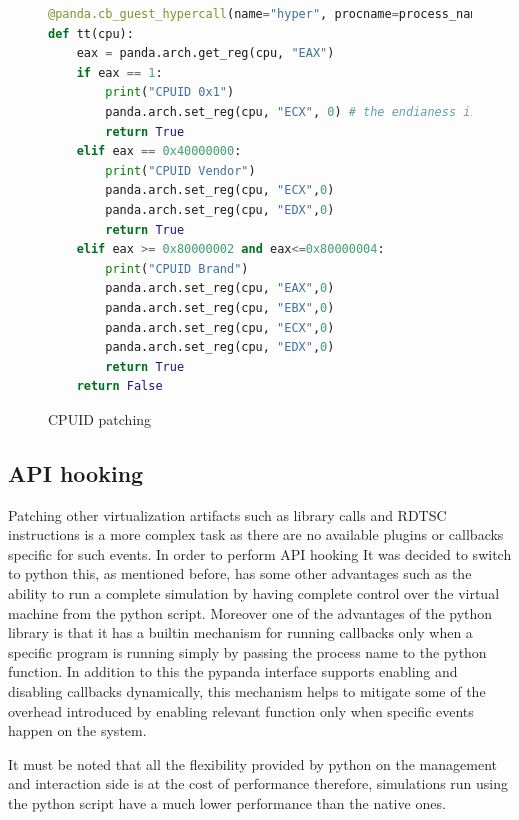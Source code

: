 \begin{figure}[htp]
\centering
\begin{lstlisting}[language=Python] 
@panda.cb_guest_hypercall(name="hyper", procname=process_name)
def tt(cpu):
    eax = panda.arch.get_reg(cpu, "EAX")
    if eax == 1:
        print("CPUID 0x1")
        panda.arch.set_reg(cpu, "ECX", 0) # the endianess is swapped (?)
        return True
    elif eax == 0x40000000:
        print("CPUID Vendor")
        panda.arch.set_reg(cpu, "ECX",0)
        panda.arch.set_reg(cpu, "EDX",0)
        return True
    elif eax >= 0x80000002 and eax<=0x80000004:
        print("CPUID Brand")
        panda.arch.set_reg(cpu, "EAX",0)
        panda.arch.set_reg(cpu, "EBX",0)
        panda.arch.set_reg(cpu, "ECX",0)
        panda.arch.set_reg(cpu, "EDX",0)
        return True
    return False
\end{lstlisting}
\caption{CPUID patching}
\label{fig:cpuidpat}
\end{figure}


\subsection{API hooking}

Patching other virtualization artifacts such as library calls and RDTSC instructions is a more complex task as there are no available plugins or callbacks specific for such events. In order to perform API hooking It was decided to switch to python this, as mentioned before, has some other advantages such as the ability to run a complete simulation by having complete control over the virtual machine from the python script. Moreover one of the advantages of the python library is that it has a builtin mechanism for running callbacks only when a specific program is running simply by passing the process name to the python function. In addition to this the pypanda interface supports enabling and disabling callbacks dynamically, this mechanism helps to mitigate some of the overhead introduced by enabling relevant function only when specific events happen on the system.

It must be noted that all the flexibility provided by python on the management and interaction side is at the cost of performance therefore, simulations run using the python script have a much lower performance than the native ones. 


